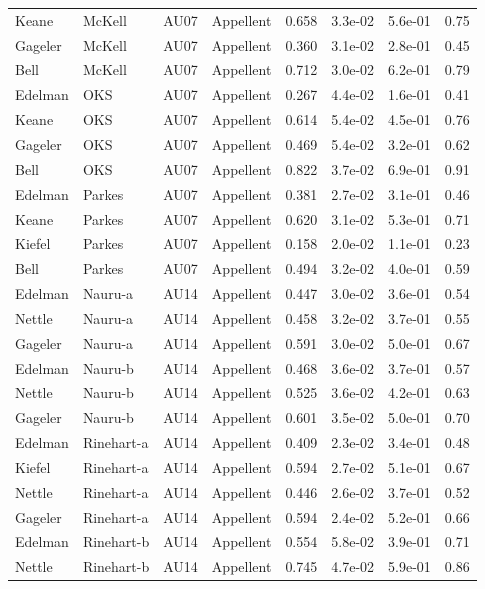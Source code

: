 \documentclass{monashthesis}
\begin{document}
\begin{center}
\begin{longtable}{llllllll}
Keane & McKell & AU07 & Appellent & 0.658 & 3.3e-02 & 5.6e-01 & 0.75 \\
Gageler & McKell & AU07 & Appellent & 0.360 & 3.1e-02 & 2.8e-01 & 0.45 \\
Bell & McKell & AU07 & Appellent & 0.712 & 3.0e-02 & 6.2e-01 & 0.79 \\
Edelman & OKS & AU07 & Appellent & 0.267 & 4.4e-02 & 1.6e-01 & 0.41 \\
Keane & OKS & AU07 & Appellent & 0.614 & 5.4e-02 & 4.5e-01 & 0.76 \\
Gageler & OKS & AU07 & Appellent & 0.469 & 5.4e-02 & 3.2e-01 & 0.62 \\
Bell & OKS & AU07 & Appellent & 0.822 & 3.7e-02 & 6.9e-01 & 0.91 \\
Edelman & Parkes & AU07 & Appellent & 0.381 & 2.7e-02 & 3.1e-01 & 0.46 \\
Keane & Parkes & AU07 & Appellent & 0.620 & 3.1e-02 & 5.3e-01 & 0.71 \\
Kiefel & Parkes & AU07 & Appellent & 0.158 & 2.0e-02 & 1.1e-01 & 0.23 \\
Bell & Parkes & AU07 & Appellent & 0.494 & 3.2e-02 & 4.0e-01 & 0.59 \\
Edelman & Nauru-a & AU14 & Appellent & 0.447 & 3.0e-02 & 3.6e-01 & 0.54 \\
Nettle & Nauru-a & AU14 & Appellent & 0.458 & 3.2e-02 & 3.7e-01 & 0.55 \\
Gageler & Nauru-a & AU14 & Appellent & 0.591 & 3.0e-02 & 5.0e-01 & 0.67 \\
Edelman & Nauru-b & AU14 & Appellent & 0.468 & 3.6e-02 & 3.7e-01 & 0.57 \\
Nettle & Nauru-b & AU14 & Appellent & 0.525 & 3.6e-02 & 4.2e-01 & 0.63 \\
Gageler & Nauru-b & AU14 & Appellent & 0.601 & 3.5e-02 & 5.0e-01 & 0.70 \\
Edelman & Rinehart-a & AU14 & Appellent & 0.409 & 2.3e-02 & 3.4e-01 & 0.48 \\
Kiefel & Rinehart-a & AU14 & Appellent & 0.594 & 2.7e-02 & 5.1e-01 & 0.67 \\
Nettle & Rinehart-a & AU14 & Appellent & 0.446 & 2.6e-02 & 3.7e-01 & 0.52 \\
Gageler & Rinehart-a & AU14 & Appellent & 0.594 & 2.4e-02 & 5.2e-01 & 0.66 \\
Edelman & Rinehart-b & AU14 & Appellent & 0.554 & 5.8e-02 & 3.9e-01 & 0.71 \\
Nettle & Rinehart-b & AU14 & Appellent & 0.745 & 4.7e-02 & 5.9e-01 & 0.86 \\

\end{longtable}
\end{center}
\end{document}
